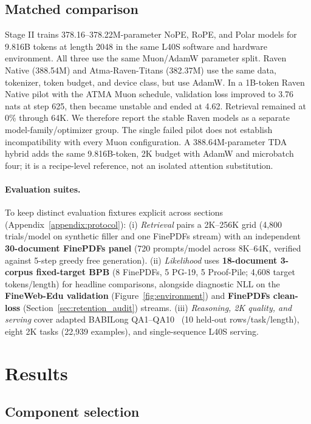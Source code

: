 \documentclass{article}
\newcommand{\rev}[1]{{\color{revcolor}#1}}
\begin{document}
\subsection{Matched comparison}
Stage II trains 378.16--378.22M-parameter NoPE, RoPE, and Polar models for 9.816B tokens at length 2048 in the same L40S software and hardware environment. All three use the same Muon/AdamW parameter split. Raven Native (388.54M) and Atma-Raven-Titans (382.37M) use the same data, tokenizer, token budget, and device class, but use AdamW. In a 1B-token Raven Native pilot with the ATMA Muon schedule, validation loss improved to 3.76 nats at step 625, then became unstable and ended at 4.62. Retrieval remained at 0\% through 64K. We therefore report the stable Raven models as a separate model-family/optimizer group. The single failed pilot does not establish incompatibility with every Muon configuration. A 388.64M-parameter TDA hybrid adds the same 9.816B-token, 2K budget with AdamW and microbatch four; it is a recipe-level reference, not an isolated attention substitution.

\paragraph{Evaluation suites.}
\rev{To keep distinct evaluation fixtures explicit across sections (Appendix~\ref{appendix:protocol}): (i) \emph{Retrieval} pairs a 2K--256K grid (4,800 trials/model on synthetic filler and one FinePDFs stream) with an independent \textbf{30-document FinePDFs panel} (720 prompts/model across 8K--64K, verified against 5-step greedy free generation). (ii) \emph{Likelihood} uses \textbf{18-document 3-corpus fixed-target BPB} (8 FinePDFs, 5 PG-19, 5 Proof-Pile; 4,608 target tokens/length) for headline comparisons, alongside diagnostic NLL on the \textbf{FineWeb-Edu validation} (Figure~\ref{fig:environment}) and \textbf{FinePDFs clean-loss} (Section~\ref{sec:retention_audit}) streams.} (iii) \emph{Reasoning, 2K quality, and serving} cover adapted BABILong QA1--QA10~\citep{babilong2024} (10 held-out rows/task/length), eight 2K tasks (22,939 examples), and single-sequence L40S serving.

\section{Results}

\subsection{Component selection}
\end{document}
